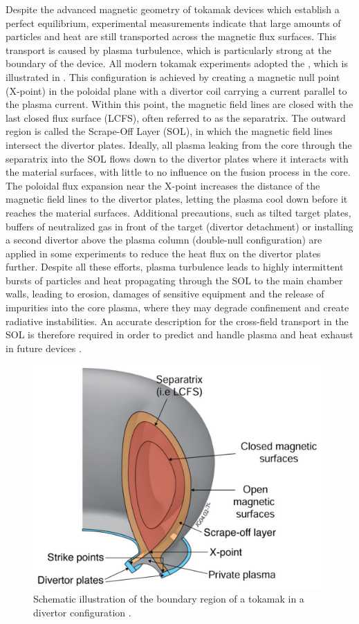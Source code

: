 Despite the advanced magnetic geometry of tokamak devices which establish a perfect equilibrium, experimental measurements indicate that large amounts of particles and heat are still transported across the magnetic flux surfaces. This transport is caused by plasma turbulence, which is particularly strong at the boundary of the device. All modern tokamak experiments adopted the , which is illustrated in . This configuration is achieved by creating a magnetic null point (X-point) in the poloidal plane with a divertor coil carrying a current parallel to the plasma current. Within this point, the magnetic field lines are closed with the last closed flux surface (LCFS), often referred to as the separatrix. The outward region is called the Scrape-Off Layer (SOL), in which the magnetic field lines intersect the divertor plates. Ideally, all plasma leaking from the core through the separatrix into the SOL flows down to the divertor plates where it interacts with the material surfaces, with little to no influence on the fusion process in the core. The poloidal flux expansion near the X-point increases the distance of the magnetic field lines to the divertor plates, letting the plasma cool down before it reaches the material surfaces. Additional precautions, such as tilted target plates, buffers of neutralized gas in front of the target
(divertor detachment) or installing a second divertor above the plasma column (double-null configuration) are applied in some experiments to reduce the heat flux on the divertor plates further. Despite all these efforts, plasma turbulence leads to highly intermittent bursts of particles and heat propagating through the SOL to the main chamber walls, leading to erosion, damages of sensitive equipment and the release of impurities into the core plasma, where they may degrade confinement and create radiative instabilities. An accurate description for the cross-field transport in the SOL is therefore required in order to predict and handle plasma and heat exhaust in future devices \cite{freidberg2008plasma}.
\begin{figure}[t]
	\centering
	\includegraphics[width=11cm]{figures/sol.png}
	\caption{Schematic illustration of the boundary region of a tokamak in a divertor configuration \cite{eurofusion}.}
	\label{Fig:sol}
\end{figure}

